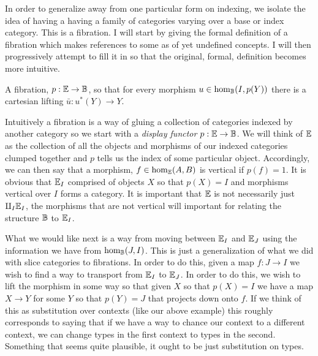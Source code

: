 In order to generalize away from one particular form on indexing, we
isolate the idea of having a having a family of categories varying
over a base or index category. This is a fibration. I will start by
giving the formal definition of a fibration which makes references to
some as of yet undefined concepts. I will then progressively attempt
to fill it in so that the original, formal, definition becomes more
intuitive.
\begin{defn}\label{defn:fibrations:fibration}
  A fibration, $p : \mathbb{E} \to \mathbb{B}$, so that for every morphism
  $u \in \hom_{\mathbb{B}}(I, p(Y))$ there is a cartesian lifting
  $\bar{u} : u^*(Y) \to Y$.
\end{defn}
Intuitively a fibration is a way of gluing a collection of categories
indexed by another category so we start with a \emph{display functor}
$p : \mathbb{E} \to \mathbb{B}$. We will think of $\mathbb{E}$ as the collection of
all the objects and morphisms of our indexed categories clumped
together and $p$ tells us the index of some particular
object. Accordingly, we can then say that a morphism,
$f \in \hom_{\mathbb{E}}(A, B)$ is vertical if $p(f) = 1$. It is obvious
that $\mathbb{E}_I$ comprised of objects $X$ so that $p(X) = I$ and
morphisms vertical over $I$ forms a category. It is important that
$\mathbb{E}$ is not necessarily just $\amalg_I \mathbb{E}_I$, the morphisms that
are not vertical will important for relating the structure $\mathbb{B}$ to
$\mathbb{E}_I$.

What we would like next is a way from moving between $\mathbb{E}_I$ and
$\mathbb{E}_J$ using the information we have from $\hom_{\mathbb{B}}(J, I)$. This
is just a generalization of what we did with slice categories to
fibrations. In order to do this, given a map $f : J \to I$ we wish to
find a way to transport from $\mathbb{E}_I$ to $\mathbb{E}_J$. In order to do
this, we wish to lift the morphism in some way so that given $X$ so
that $p(X) = I$ we have a map $X \to Y$ for some $Y$ so that
$p(Y) = J$ that projects down onto $f$. If we think of this as
substitution over contexts (like our above example) this roughly
corresponds to saying that if we have a way to chance our context to a
different context, we can change types in the first context to types
in the second. Something that seems quite plausible, it ought to be
just substitution on types.

